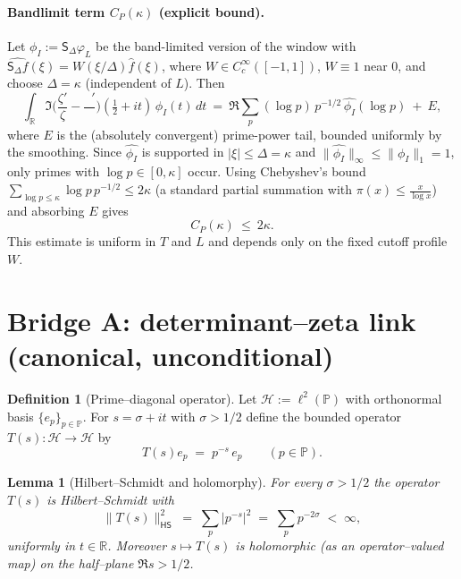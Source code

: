 \documentclass[11pt]{article}
\newtheorem{lemma}[theorem]{Lemma}
\theoremstyle{definition}
\newtheorem{definition}[theorem]{Definition}
\theoremstyle{remark}
\newcommand{\R}{\mathbb{R}}
\DeclareMathOperator{\dettwo}{det_2}
\begin{document}

\paragraph{Bandlimit term $C_P(\kappa)$ (explicit bound).}
Let $\phi_I:=\mathsf S_\Delta\varphi_L$ be the band-limited version of the window with $\widehat{\mathsf S_\Delta f}(\xi)=W(\xi/\Delta)\widehat f(\xi)$, where $W\in C_c^\infty([-1,1])$, $W\equiv 1$ near $0$, and choose $\Delta=\kappa$ (independent of $L$). Then
\[
 \int_{\R}\Im\Big(\frac{\zeta'}{\zeta}-\frac{\dettwo'}{\dettwo}\Big)\!(\tfrac12+it)\,\phi_I(t)\,dt\ =\ \Re\sum_{p}(\log p)\,p^{-1/2}\,\widehat{\phi_I}(\log p)\ +\ E,
\]
where $E$ is the (absolutely convergent) prime-power tail, bounded uniformly by the smoothing. Since $\widehat{\phi_I}$ is supported in $|\xi|\le \Delta=\kappa$ and $\|\widehat{\phi_I}\|_\infty\le\|\phi_I\|_1=1$, only primes with $\log p\in[0,\kappa]$ occur. Using Chebyshev's bound $\sum_{\log p\le \kappa}\log p\,p^{-1/2}\le 2\kappa$ (a standard partial summation with $\pi(x)\le \tfrac{x}{\log x}$) and absorbing $E$ gives
\[
 C_P(\kappa)\ \le\ 2\kappa.
\]
This estimate is uniform in $T$ and $L$ and depends only on the fixed cutoff profile $W$.

\section{Bridge A: determinant--zeta link (canonical, unconditional)}\label{sec:bridge-A}

\begin{definition}[Prime--diagonal operator]\label{def:T}
Let $\mathcal H:=\ell^{2}(\mathbb P)$ with orthonormal basis $\{e_{p}\}_{p\in\mathbb P}$. For $s=\sigma+it$ with $\sigma>1/2$ define the bounded operator $T(s):\mathcal H\to\mathcal H$ by
\[
  T(s)e_{p} \;=\; p^{-s}\,e_{p}\qquad(p\in\mathbb P).
\]
\end{definition}

\begin{lemma}[Hilbert--Schmidt and holomorphy]\label{lem:HS}
For every $\sigma>1/2$ the operator $T(s)$ is Hilbert--Schmidt with
\[
  \|T(s)\|_{\mathsf{HS}}^{2}
  \;=\;\sum_{p} |p^{-s}|^{2}
  \;=\;\sum_{p} p^{-2\sigma}
  \;<\;\infty,
\]
uniformly in $t\in\mathbb R$. Moreover $s\mapsto T(s)$ is holomorphic (as an operator--valued map) on the half--plane $\Re s>1/2$.
\end{lemma}
\end{document}
